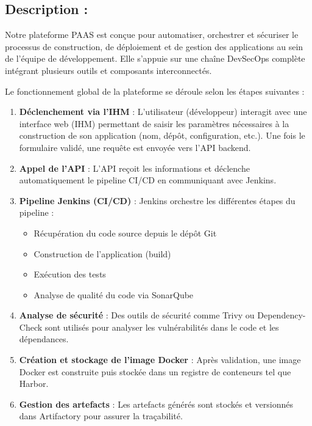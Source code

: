 \subsection{Description :}

Notre plateforme PAAS est conçue pour automatiser, orchestrer et sécuriser le processus de construction, de déploiement et de gestion des applications au sein de l’équipe de développement. Elle s’appuie sur une chaîne DevSecOps complète intégrant plusieurs outils et composants interconnectés.

Le fonctionnement global de la plateforme se déroule selon les étapes suivantes :

\begin{enumerate}
    \item \textbf{Déclenchement via l’IHM} :  
    L’utilisateur (développeur) interagit avec une interface web (IHM) permettant de saisir les paramètres nécessaires à la construction de son application (nom, dépôt, configuration, etc.). Une fois le formulaire validé, une requête est envoyée vers l’API backend.

    \item \textbf{Appel de l’API} :  
    L’API reçoit les informations et déclenche automatiquement le pipeline CI/CD en communiquant avec Jenkins.

    \item \textbf{Pipeline Jenkins (CI/CD)} :  
    Jenkins orchestre les différentes étapes du pipeline :
    \begin{itemize}
        \item Récupération du code source depuis le dépôt Git
        \item Construction de l’application (build)
        \item Exécution des tests
        \item Analyse de qualité du code via SonarQube
    \end{itemize}

    \item \textbf{Analyse de sécurité} :  
    Des outils de sécurité comme Trivy ou Dependency-Check sont utilisés pour analyser les vulnérabilités dans le code et les dépendances.

    \item \textbf{Création et stockage de l’image Docker} :  
    Après validation, une image Docker est construite puis stockée dans un registre de conteneurs tel que Harbor.

    \item \textbf{Gestion des artefacts} :  
    Les artefacts générés sont stockés et versionnés dans Artifactory pour assurer la traçabilité.


\end{enumerate}
